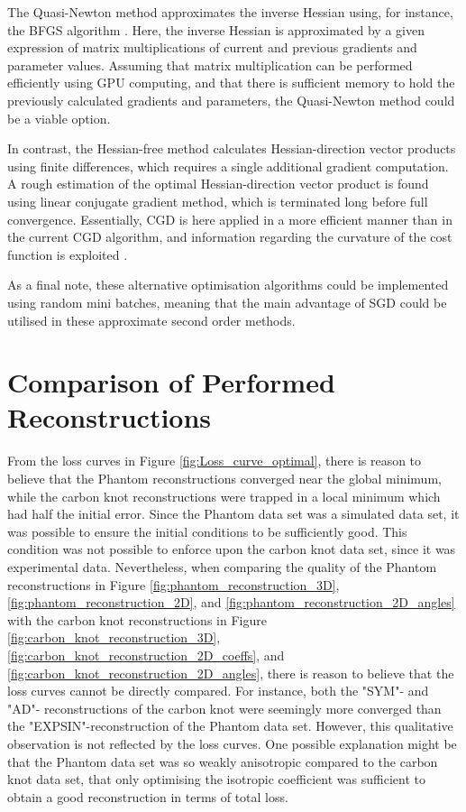 The Quasi-Newton method approximates the inverse Hessian using, for instance, the BFGS algorithm \cite{tan2019review}.
Here, the inverse Hessian is approximated by a given expression of matrix multiplications of current and previous gradients and parameter values.
Assuming that matrix multiplication can be performed efficiently using GPU computing, and that there is sufficient memory to hold the previously calculated gradients and parameters,
the Quasi-Newton method could be a viable option.

In contrast, the Hessian-free method calculates Hessian-direction vector products using finite differences, which requires a single additional gradient computation.
A rough estimation of the optimal Hessian-direction vector product is found using linear conjugate gradient method, which is terminated long before full convergence.
Essentially, CGD is here applied in a more efficient manner than in the current CGD algorithm, and information regarding the curvature of the cost function is exploited \cite{martens2010deep}.

As a final note, these alternative optimisation algorithms could be implemented using random mini batches, meaning that the main advantage of SGD could be utilised in these approximate second order methods.


\section{Comparison of Performed Reconstructions}
\noindent
From the loss curves in Figure \ref{fig:Loss_curve_optimal},
there is reason to believe that the Phantom reconstructions converged near the global minimum, while the carbon knot reconstructions
were trapped in a local minimum which had half the initial error.
Since the Phantom data set was a simulated data set, it was possible to ensure the initial conditions to be sufficiently good.
This condition was not possible to enforce upon the carbon knot data set, since it was experimental data.
Nevertheless, when comparing the quality of the Phantom reconstructions in Figure \ref{fig:phantom_reconstruction_3D}, \ref{fig:phantom_reconstruction_2D},
and \ref{fig:phantom_reconstruction_2D_angles} with the carbon knot reconstructions in Figure \ref{fig:carbon_knot_reconstruction_3D}, \ref{fig:carbon_knot_reconstruction_2D_coeffs},
and \ref{fig:carbon_knot_reconstruction_2D_angles}, there is reason to believe that the loss curves cannot be directly compared.
For instance, both the "SYM"- and "AD"- reconstructions of the carbon knot were seemingly more converged than the "EXPSIN"-reconstruction of the Phantom data set.
However, this qualitative observation is not reflected by the loss curves.
One possible explanation might be that the Phantom data set was so weakly anisotropic compared to the carbon knot data set,
that only optimising the isotropic coefficient was sufficient to obtain a good reconstruction in terms of total loss.

